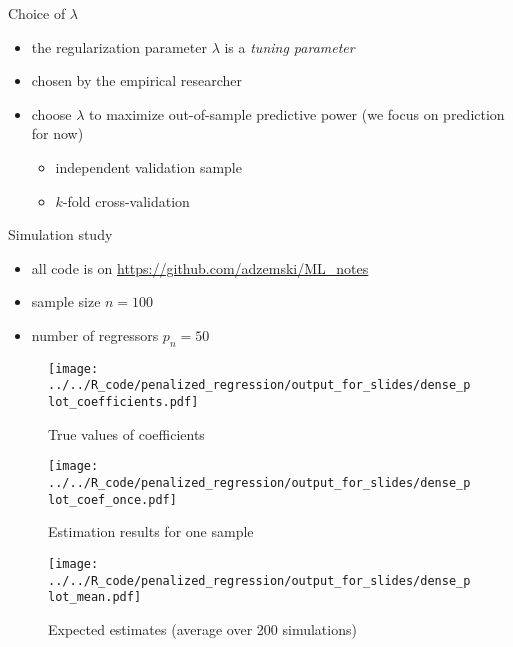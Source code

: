 \documentclass[xcolor=dvipsnames, handout]{beamer}
\begin{document}
\begin{frame}{Choice of $\lambda$}
\begin{itemize}[<+->]
\item the regularization parameter $\lambda$ is a \emph{tuning parameter}
\item chosen by the empirical researcher
\item choose $\lambda$ to maximize out-of-sample predictive power (we focus on prediction for now) 
\begin{itemize}
  \item independent validation sample 
  \item $k$-fold cross-validation
\end{itemize}
\end{itemize}
\end{frame}


\begin{frame}{Simulation study}
\begin{itemize}
  \item all code is on \url{https://github.com/adzemski/ML_notes}
  \item sample size $n = 100$
  \item number of regressors $p_n = 50$
\end{itemize}
\end{frame}


\begin{frame}
\begin{figure}
  \texttt{[image: ../../R\_code/penalized\_regression/output\_for\_slides/dense\_plot\_coefficients.pdf]}
   \caption{True values of coefficients}
\end{figure}
\end{frame}

\begin{frame}
\begin{figure}
  \texttt{[image: ../../R\_code/penalized\_regression/output\_for\_slides/dense\_plot\_coef\_once.pdf]}
   \caption{Estimation results for one sample}
\end{figure}
\end{frame}

\begin{frame}
\begin{figure}
  \texttt{[image: ../../R\_code/penalized\_regression/output\_for\_slides/dense\_plot\_mean.pdf]}
   \caption{Expected estimates (average over 200 simulations)}
\end{figure}
\end{frame}
\end{document}
